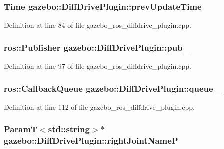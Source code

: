 \subsubsection[{prevUpdateTime}]{\setlength{\rightskip}{0pt plus 5cm}Time {\bf gazebo::DiffDrivePlugin::prevUpdateTime}\hspace{0.3cm}{\ttfamily  [private]}}\label{classgazebo_1_1DiffDrivePlugin_a384e2c43a7e1d7494741cfa2477f99ca}


Definition at line 84 of file gazebo\_\-ros\_\-diffdrive\_\-plugin.cpp.

\subsubsection[{pub\_\-}]{\setlength{\rightskip}{0pt plus 5cm}ros::Publisher {\bf gazebo::DiffDrivePlugin::pub\_\-}\hspace{0.3cm}{\ttfamily  [private]}}\label{classgazebo_1_1DiffDrivePlugin_a92718144bfdc2527f6e971590f2761ed}


Definition at line 97 of file gazebo\_\-ros\_\-diffdrive\_\-plugin.cpp.

\subsubsection[{queue\_\-}]{\setlength{\rightskip}{0pt plus 5cm}ros::CallbackQueue {\bf gazebo::DiffDrivePlugin::queue\_\-}\hspace{0.3cm}{\ttfamily  [private]}}\label{classgazebo_1_1DiffDrivePlugin_a9401ec20a04a3cd0a5a4a7079a8e00fb}


Definition at line 112 of file gazebo\_\-ros\_\-diffdrive\_\-plugin.cpp.

\subsubsection[{rightJointNameP}]{\setlength{\rightskip}{0pt plus 5cm}ParamT$<$std::string$>$$\ast$ {\bf gazebo::DiffDrivePlugin::rightJointNameP}\hspace{0.3cm}{\ttfamily  [private]}}\label{classgazebo_1_1DiffDrivePlugin_a81c1de952961f6942982fe0e0b385a6b}


